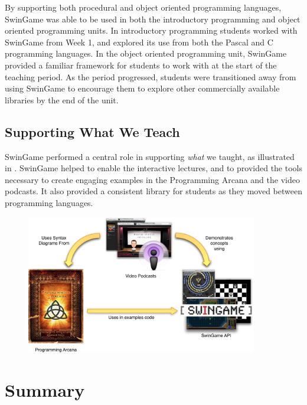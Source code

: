 By supporting both procedural and object oriented programming languages, SwinGame was able to be used in both the introductory programming and object oriented programming units. In introductory programming students worked with SwinGame from Week 1, and explored its use from both the Pascal and C programming languages. In the object oriented programming unit, SwinGame provided a familiar framework for students to work with at the start of the teaching period. As the period progressed, students were transitioned away from using SwinGame to encourage them to explore other commercially available libraries by the end of the unit.

\subsection{Supporting What We Teach} %
\label{sub:supporting_what_we_teach}

SwinGame performed a central role in supporting \emph{what} we taught, as illustrated in . SwinGame helped to enable the interactive lectures, and to provided the tools necessary to create engaging examples in the Programming Arcana and the video podcasts. It also provided a consistent library for students as they moved between programming languages.

\begin{figure}[thb]
  \centering
  \includegraphics[width=0.9\textwidth]{SupportWhatWeTeach}
  \caption{}
  \label{fig:what_we_teach}
\end{figure}




\section{Summary} %
\label{sec:supporting_summary}



